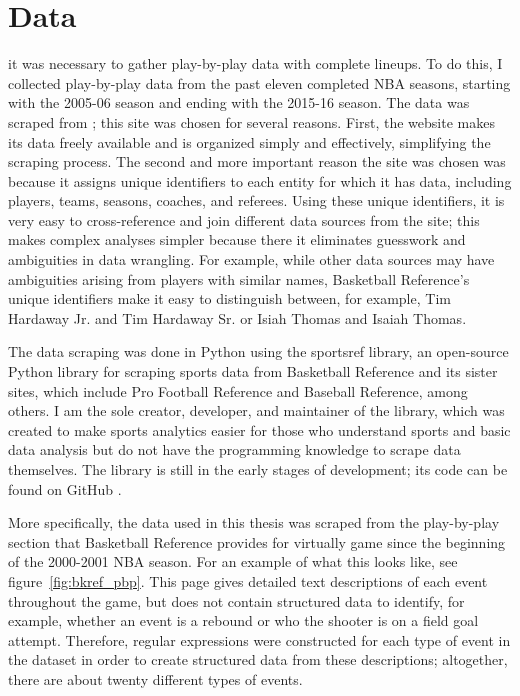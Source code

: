 
\chapter{Data} \label{ch:data}

 it was necessary to gather
play-by-play data with complete lineups. To do this, I collected play-by-play data
from the past eleven completed NBA seasons, starting with the 2005-06 season and
ending with the 2015-16 season. The data was scraped from \citet{BKRef}; this site
was chosen for several reasons. First, the website makes its data freely available
and is organized simply and effectively, simplifying the scraping process.  The
second and more important reason the site was chosen was because it assigns unique
identifiers to each entity for which it has data, including players, teams, seasons,
coaches, and referees. Using these unique identifiers, it is very easy to
cross-reference and join different data sources from the site; this makes complex
analyses simpler because there it eliminates guesswork and ambiguities in data
wrangling. For example, while other data sources may have ambiguities arising from
players with similar names, Basketball Reference's unique identifiers make it easy
to distinguish between, for example, Tim Hardaway Jr. and Tim Hardaway Sr. or Isiah
Thomas and Isaiah Thomas.

The data scraping was done in Python using the sportsref library, an open-source
Python library for scraping sports data from Basketball Reference and its sister
sites, which include Pro Football Reference and Baseball Reference, among others. I
am the sole creator, developer, and maintainer of the library, which was
created to make sports analytics easier for those who understand sports and basic
data analysis but do not have the programming knowledge to scrape data themselves.
The library is still in the early stages of development; its code can be found on
GitHub \cite{Sportsref}.

More specifically, the data used in this thesis was scraped from the play-by-play
section that Basketball Reference provides for virtually game since the beginning of
the 2000-2001 NBA season. For an example of what this looks like, see
figure~\ref{fig:bkref_pbp}. This page gives detailed text descriptions
of each event throughout the game, but does not contain structured data to identify,
for example, whether an event is a rebound or who the shooter is on a field goal
attempt. Therefore, regular expressions were constructed for each type of event in
the dataset in order to create structured data from these descriptions; altogether,
there are about twenty different types of events.

